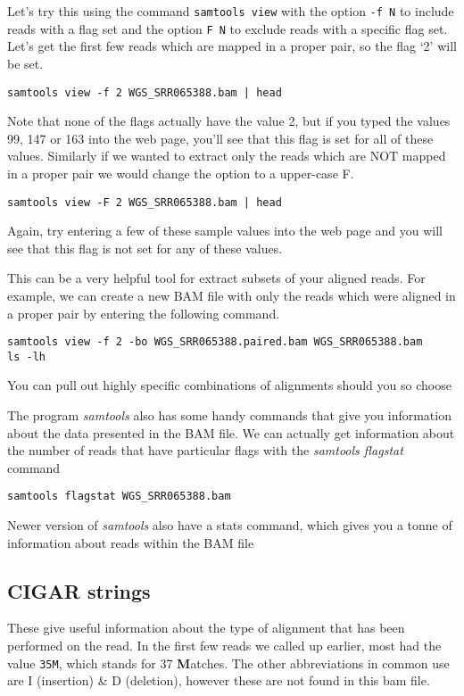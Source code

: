\begin{steps}
Let's try this using the command \texttt{samtools view} with the option \texttt{-f N} to include reads with a flag set and the option \texttt{F N} to exclude reads with a specific flag set.
Let's get the first few reads which are mapped in a proper pair, so the flag `2' will be set.\\
\begin{lstlisting}
samtools view -f 2 WGS_SRR065388.bam | head
\end{lstlisting}
Note that none of the flags actually have the value 2, but if you typed the values 99, 147 or 163 into the web page, you'll see that this flag is set for all of these values.
Similarly if we wanted to extract only the reads which are NOT mapped in a proper pair we would change the option to a upper-case F.
\begin{lstlisting}
samtools view -F 2 WGS_SRR065388.bam | head
\end{lstlisting}
Again, try entering a few of these sample values into the web page and you will see that this flag is not set for any of these values.
\end{steps}

\begin{information}
This can be a very helpful tool for extract subsets of your aligned reads.
For example, we can create a new BAM file with only the reads which were aligned in a proper pair by entering the following command.
\begin{lstlisting}
samtools view -f 2 -bo WGS_SRR065388.paired.bam WGS_SRR065388.bam
ls -lh
\end{lstlisting}
You can pull out highly specific combinations of alignments should you so choose
\end{information}

\begin{information}
The program \textit{samtools} also has some handy commands that give you information about the data presented in the BAM file.
We can actually get information about the number of reads that have particular flags with the \textit{samtools flagstat} command
\begin{lstlisting}
samtools flagstat WGS_SRR065388.bam
\end{lstlisting}
Newer version of \textit{samtools} also have a stats command, which gives you a tonne of information about reads within the BAM file
\end{information}

\subsection{CIGAR strings}
\begin{note}
These give useful information about the type of alignment that has been performed on the read.
In the first few reads we called up earlier, most had the value \texttt{35M}, which stands for 37 \textbf{M}atches.
The other abbreviations in common use are I (insertion) \& D (deletion), however these are not found in this bam file.
\end{note}

